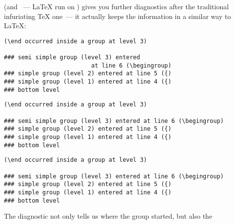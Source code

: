 \eTeX{} (and \elatex{}~--- \LaTeX{} run on \eTeX{}) gives you
further diagnostics after the traditional infuriating \TeX{} one~--- it
actually keeps the information in a similar way to \LaTeX{}:
\htmlignore
\begin{dviversion}
\begin{verbatim}
(\end occurred inside a group at level 3)

### semi simple group (level 3) entered
                         at line 6 (\begingroup)
### simple group (level 2) entered at line 5 ({)
### simple group (level 1) entered at line 4 ({)
### bottom level
\end{verbatim}
\end{dviversion}
\begin{pdfversion}
\begin{verbatim}
(\end occurred inside a group at level 3)

### semi simple group (level 3) entered at line 6 (\begingroup)
### simple group (level 2) entered at line 5 ({)
### simple group (level 1) entered at line 4 ({)
### bottom level
\end{verbatim}
\end{pdfversion}
\endhtmlignore
\begin{htmlversion}
\begin{verbatim}
(\end occurred inside a group at level 3)

### semi simple group (level 3) entered at line 6 (\begingroup)
### simple group (level 2) entered at line 5 ({)
### simple group (level 1) entered at line 4 ({)
### bottom level
\end{verbatim}
\end{htmlversion}
The diagnostic not only tells us where the group started, but also the
